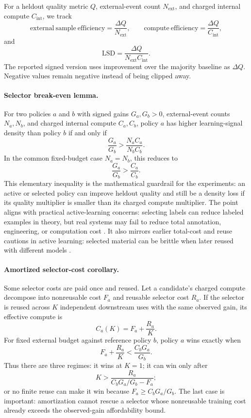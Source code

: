 \documentclass[11pt]{article}
\newcommand{\LSD}{\mathrm{LSD}}
\begin{document}
For a heldout quality metric $Q$, external-event count $N_{\mathrm{ext}}$, and
charged internal compute $C_{\mathrm{int}}$, we track
\[
\mathrm{external\ sample\ efficiency} =
\frac{\Delta Q}{N_{\mathrm{ext}}},
\qquad
\mathrm{compute\ efficiency} =
\frac{\Delta Q}{C_{\mathrm{int}}},
\]
and
\[
\LSD =
\frac{\Delta Q}{N_{\mathrm{ext}} C_{\mathrm{int}}}.
\]
The reported signed version uses improvement over the majority baseline as
$\Delta Q$. Negative values remain negative instead of being clipped away.

\paragraph{Selector break-even lemma.}
For two policies $a$ and $b$ with signed gains $G_a,G_b>0$, external-event
counts $N_a,N_b$, and charged internal compute $C_a,C_b$, policy $a$ has higher
learning-signal density than policy $b$ if and only if
\[
\frac{G_a}{G_b} >
\frac{N_a C_a}{N_b C_b}.
\]
In the common fixed-budget case $N_a=N_b$, this reduces to
\[
\frac{G_a}{G_b} >
\frac{C_a}{C_b}.
\]
This elementary inequality is the mathematical guardrail for the experiments:
an active or selected policy can improve heldout quality and still be a density
loss if its quality multiplier is smaller than its charged compute multiplier.
The point aligns with practical active-learning concerns: selecting labels can
reduce labeled examples in theory, but real systems may fail to reduce total
annotation, engineering, or computation cost \cite{settles2011theories}.
It also mirrors earlier total-cost and reuse cautions in active learning:
selected material can be brittle when later reused with different models
\cite{baldridge2004active}.

\paragraph{Amortized selector-cost corollary.}
Some selector costs are paid once and reused. Let a candidate's charged compute
decompose into nonreusable cost $F_a$ and reusable selector cost $R_a$. If the
selector is reused across $K$ independent downstream uses with the same observed
gain, its effective compute is
\[
C_a(K)=F_a+\frac{R_a}{K}.
\]
For fixed external budget against reference policy $b$, policy $a$ wins exactly
when
\[
F_a+\frac{R_a}{K}
<
\frac{C_bG_a}{G_b}.
\]
Thus there are three regimes: it wins at $K=1$; it can win only after
\[
K>
\frac{R_a}{C_bG_a/G_b-F_a};
\]
or no finite reuse can make it win because $F_a\ge C_bG_a/G_b$. The last case is
important: amortization cannot rescue a selector whose nonreusable training
cost already exceeds the observed-gain affordability bound.
\end{document}
